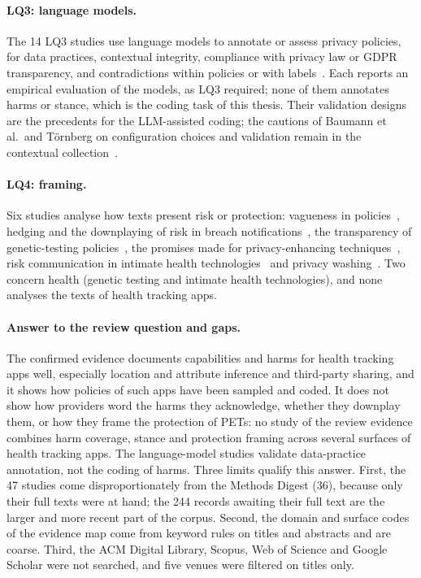 \paragraph{LQ3: language models.} The 14 LQ3 studies use language models to
annotate or assess privacy policies, for data practices, contextual
integrity, compliance with privacy law or GDPR transparency, and contradictions
within policies or with labels~\parencite{rodriguez2024llm,chanenson2025automating,xie2025evaluating}.
Each reports an empirical evaluation of the models, as LQ3 required; none of
them annotates harms or stance, which is the coding task of this thesis. Their validation designs are the precedents for the
LLM-assisted coding; the cautions of Baumann et al.\ and Törnberg on
configuration choices and validation remain in the contextual
collection~\parencite{baumann2025llm,tornberg2024best}.

\paragraph{LQ4: framing.} Six studies analyse how texts present risk or
protection: vagueness in policies~\parencite{lebanoff2018automatic}, hedging and
the downplaying of risk in breach notifications~\parencite{zou2019might}, the
transparency of genetic-testing policies~\parencite{doan2024transparency}, the
promises made for privacy-enhancing techniques~\parencite{martin2025cookies},
risk communication in intimate health technologies~\parencite{moniz2025toward}
and privacy washing~\parencite{brackin2026privacy}. Two concern health
(genetic testing and intimate health technologies), and none analyses the texts
of health tracking apps.

\paragraph{Answer to the review question and gaps.} The confirmed evidence
documents capabilities and harms for health tracking apps well, especially
location and attribute inference and third-party sharing, and it shows how
policies of such apps have been sampled and coded. It does not show how
providers word the harms they acknowledge, whether they downplay them, or how
they frame the protection of PETs: no study of the review evidence combines
harm coverage, stance and protection framing across several surfaces of health
tracking apps. The language-model studies validate data-practice annotation,
not the coding of harms. Three limits qualify this answer. First, the 47
studies come disproportionately from the Methods Digest (36), because only
their full texts were at hand; the 244 records awaiting their full text are the
larger and more recent part of the corpus. Second, the domain and surface codes
of the evidence map come from keyword rules on titles and abstracts and are
coarse. Third, the ACM Digital Library, Scopus, Web of Science and Google
Scholar were not searched, and five venues were filtered on titles only.

